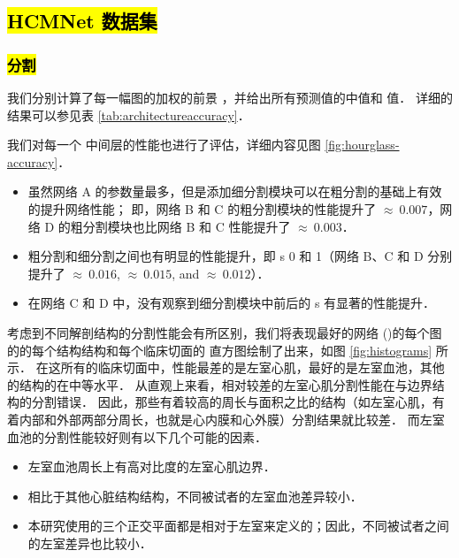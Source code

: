 \subsection{\hl{HCMNet 数据集}}



\subsubsection{\hl{分割}}

我们分别计算了每一幅图的加权的前景 \IoU{}，并给出所有预测值的中值和 \IQR{} 值．
详细的结果可以参见表 \ref{tab:architectureaccuracy}．



我们对每一个 \UNet{} 中间层的性能也进行了评估，详细内容见图 \ref{fig:hourglass-accuracy}．

\begin{itemize}
\item 虽然网络 A 的参数量最多，但是添加细分割模块可以在粗分割的基础上有效的提升网络性能；
即，网络 B 和 C 的粗分割模块的性能提升了 $\approx~0.007$，网络 D 的粗分割模块也比网络 B 和 C 性能提升了 $\approx~0.003$．
\item 粗分割和细分割之间也有明显的性能提升，即 \UNet{}s 0 和 1（网络 B、C 和 D 分别提升了 $\approx~0.016$, $\approx~0.015$, and $\approx~0.012$）．
\item 在网络 C 和 D 中，没有观察到细分割模块中前后的 \UNet{}s 有显著的性能提升．
\end{itemize}



考虑到不同解剖结构的分割性能会有所区别，我们将表现最好的网络 (\bestnetwork{})的每个图的的每个结构结构和每个临床切面的 \IoU{} 直方图绘制了出来，如图 \ref{fig:histograms} 所示．
在这所有的临床切面中，性能最差的是左室心肌，最好的是左室血池，其他的结构的在中等水平．
从直观上来看，相对较差的左室心肌分割性能在与边界结构的分割错误．
因此，那些有着较高的周长与面积之比的结构（如左室心肌，有着内部和外部两部分周长，也就是心内膜和心外膜）分割结果就比较差．
而左室血池的分割性能较好则有以下几个可能的因素．

\begin{itemize}
\item 左室血池周长上有高对比度的左室心肌边界．
\item 相比于其他心脏结构结构，不同被试者的左室血池差异较小．
\item 本研究使用的三个正交平面都是相对于左室来定义的；因此，不同被试者之间的左室差异也比较小．
\end{itemize}

